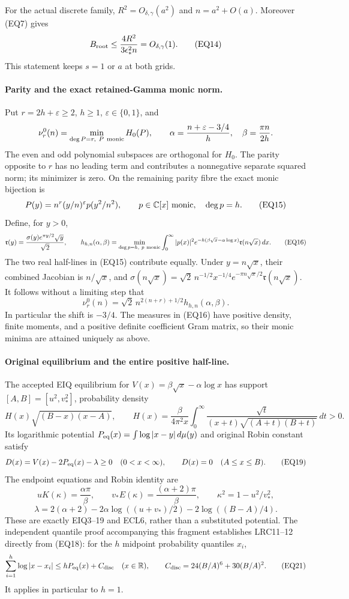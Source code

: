 \documentclass[11pt,a4paper]{article}
\begin{document}
For the actual discrete family,
\(R^2=O_{\delta,\gamma}(a^2)\) and \(n=a^2+O(a)\).  Moreover (EQ7) gives
\[
 B_{\rm root}\le\frac{4R^2}{3\epsilon_*^2n}
       =O_{\delta,\gamma}(1).
\tag{EQ14}
\]
This statement keeps \(s=1\) or \(a\) at both grids.

\paragraph{Parity and the exact retained-Gamma monic norm.}
Put \(r=2h+\varepsilon\ge2\), \(h\ge1\), \(\varepsilon\in\{0,1\}\), and
\[
 \nu_r^0(n)=\min_{\deg P=r,\ P\ {\rm monic}}H_0(P),\qquad
 \alpha=\frac{n+\varepsilon-3/4}{h},\quad
 \beta=\frac{\pi n}{2h}.
\]
The even and odd polynomial subspaces are orthogonal for \(H_0\).
The parity opposite to \(r\) has no leading term and contributes a
nonnegative separate squared norm; its minimizer is zero.  On the
remaining parity fibre the exact monic bijection is
\[
 P(y)=n^r(y/n)^\varepsilon p(y^2/n^2),\qquad
 p\in\mathbb C[x]\ {\rm monic},\quad\deg p=h.
\tag{EQ15}
\]
Define, for \(y>0\),
\[
 {\mathfrak r}(y)=\frac{\sigma(y)e^{\pi y/2}\sqrt y}{\sqrt2},\qquad
 h_{h,n}(\alpha,\beta)
 =\min_{\deg p=h,\ p\ {\rm monic}}
   \int_0^\infty |p(x)|^2 e^{-h(\beta\sqrt x-\alpha\log x)}
                         {\mathfrak r}(n\sqrt x)\,dx.
\tag{EQ16}
\]
The two real half-lines in (EQ15) contribute equally.  Under
\(y=n\sqrt x\), their combined Jacobian is \(n/\sqrt x\), and
\(\sigma(n\sqrt x)=\sqrt2\,n^{-1/2}x^{-1/4}
e^{-\pi n\sqrt x/2}{\mathfrak r}(n\sqrt x)\).
It follows without a limiting step that
\[
 \boxed{\nu_r^0(n)=\sqrt2\,n^{2(n+r)+1/2}
                 h_{h,n}(\alpha,\beta).}
\tag{EQ17}
\]
In particular the shift is \(-3/4\).  The measures in (EQ16) have positive
density, finite moments, and a positive definite coefficient Gram matrix,
so their monic minima are attained uniquely as above.

\paragraph{Original equilibrium and the entire positive half-line.}
The accepted EIQ equilibrium for
\(V(x)=\beta\sqrt x-\alpha\log x\) has support
\([A,B]=[u^2,v_*^2]\), probability density
\[
 H(x)\sqrt{(B-x)(x-A)},\qquad
 H(x)=\frac{\beta}{4\pi^2x}
   \int_0^\infty
   \frac{\sqrt t}{(x+t)\sqrt{(A+t)(B+t)}}\,dt>0.
\tag{EQ18}
\]
Its logarithmic potential \(P_{\rm eq}(x)=\int\log|x-y|\,d\mu(y)\)
and original Robin constant satisfy
\[
 D(x)=V(x)-2P_{\rm eq}(x)-\lambda\ge0\quad(0<x<\infty),
 \qquad D(x)=0\quad(A\le x\le B).
\tag{EQ19}
\]
The endpoint equations and Robin identity are
\[
 uK(\kappa)=\frac{\alpha\pi}{\beta},\qquad
 v_*E(\kappa)=\frac{(\alpha+2)\pi}{\beta},\qquad
 \kappa^2=1-u^2/v_*^2,
\]
\[
 \lambda=2(\alpha+2)-2\alpha\log((u+v_*)/2)
                   -2\log((B-A)/4).
\tag{EQ20}
\]
These are exactly EIQ3--19 and ECL6, rather than a substituted potential.
The independent quantile proof accompanying this fragment establishes
LRC11--12 directly from (EQ18):
for the \(h\) midpoint probability quantiles \(x_i\),
\[
 \sum_{i=1}^h\log|x-x_i|
 \le hP_{\rm eq}(x)+C_{\rm disc}\quad(x\in\mathbb R),\qquad
 C_{\rm disc}=24(B/A)^6+30(B/A)^2.
\tag{EQ21}
\]
It applies in particular to \(h=1\).
\end{document}
